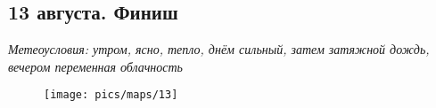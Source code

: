 \subsection{13 августа. Финиш}
\textit{Метеоусловия: утром, ясно, тепло, днём сильный, затем затяжной дождь, вечером переменная облачность}


\begin{figure}[h!]
	\centering
	\texttt{[image: pics/maps/13]}
	\label{fig:13}
\end{figure}